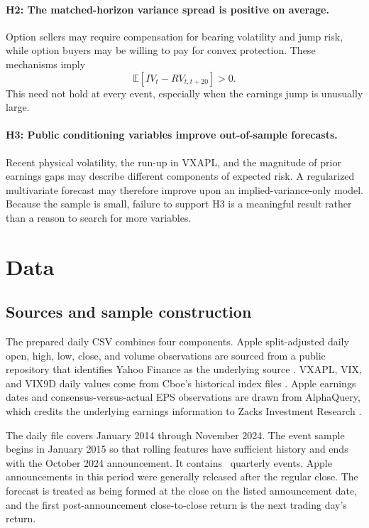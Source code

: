 \documentclass[11pt]{article}
\begin{document}
\paragraph{H2: The matched-horizon variance spread is positive on average.}
Option sellers may require compensation for bearing volatility and jump risk, while option buyers may be willing to pay for convex protection. These mechanisms imply
\begin{equation}
\mathbb{E}[IV_t-RV_{t,t+20}]>0.
\end{equation}
This need not hold at every event, especially when the earnings jump is unusually large.

\paragraph{H3: Public conditioning variables improve out-of-sample forecasts.}
Recent physical volatility, the run-up in VXAPL, and the magnitude of prior earnings gaps may describe different components of expected risk. A regularized multivariate forecast may therefore improve upon an implied-variance-only model. Because the sample is small, failure to support H3 is a meaningful result rather than a reason to search for more variables.

\section{Data}

\subsection{Sources and sample construction}

The prepared daily CSV combines four components. Apple split-adjusted daily open, high, low, close, and volume observations are sourced from a public repository that identifies Yahoo Finance as the underlying source \citep{aapldataset}. VXAPL, VIX, and VIX9D daily values come from Cboe's historical index files \citep{cboehistorical}. Apple earnings dates and consensus-versus-actual EPS observations are drawn from AlphaQuery, which credits the underlying earnings information to Zacks Investment Research \citep{alphaqueryearnings}.

The daily file covers January 2014 through November 2024. The event sample begins in January 2015 so that rolling features have sufficient history and ends with the October 2024 announcement. It contains \SampleN\ quarterly events. Apple announcements in this period were generally released after the regular close. The forecast is treated as being formed at the close on the listed announcement date, and the first post-announcement close-to-close return is the next trading day's return.
\end{document}
